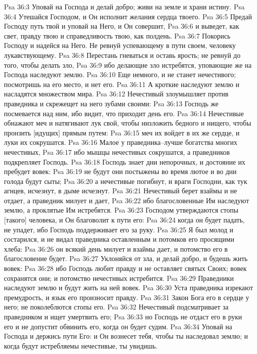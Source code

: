 Psa 36:3  Уповай на Господа и делай добро; живи на земле и храни истину.
Psa 36:4  Утешайся Господом, и Он исполнит желания сердца твоего.
Psa 36:5  Предай Господу путь твой и уповай на Него, и Он совершит,
Psa 36:6  и выведет, как свет, правду твою и справедливость твою, как полдень.
Psa 36:7  Покорись Господу и надейся на Него. Не ревнуй успевающему в пути своем, человеку лукавствующему.
Psa 36:8  Перестань гневаться и оставь ярость; не ревнуй до того, чтобы делать зло,
Psa 36:9  ибо делающие зло истребятся, уповающие же на Господа наследуют землю.
Psa 36:10  Еще немного, и не станет нечестивого; посмотришь на его место, и нет его.
Psa 36:11  А кроткие наследуют землю и насладятся множеством мира.
Psa 36:12  Нечестивый злоумышляет против праведника и скрежещет на него зубами своими:
Psa 36:13  Господь же посмевается над ним, ибо видит, что приходит день его.
Psa 36:14  Нечестивые обнажают меч и натягивают лук свой, чтобы низложить бедного и нищего, чтобы пронзить [идущих] прямым путем:
Psa 36:15  меч их войдет в их же сердце, и луки их сокрушатся.
Psa 36:16  Малое у праведника--лучше богатства многих нечестивых,
Psa 36:17  ибо мышцы нечестивых сокрушатся, а праведников подкрепляет Господь.
Psa 36:18  Господь знает дни непорочных, и достояние их пребудет вовек:
Psa 36:19  не будут они постыжены во время лютое и во дни голода будут сыты;
Psa 36:20  а нечестивые погибнут, и враги Господни, как тук агнцев, исчезнут, в дыме исчезнут.
Psa 36:21  Нечестивый берет взаймы и не отдает, а праведник милует и дает,
Psa 36:22  ибо благословенные Им наследуют землю, а проклятые Им истребятся.
Psa 36:23  Господом утверждаются стопы [такого] человека, и Он благоволит к пути его:
Psa 36:24  когда он будет падать, не упадет, ибо Господь поддерживает его за руку.
Psa 36:25  Я был молод и состарился, и не видал праведника оставленным и потомков его просящими хлеба:
Psa 36:26  он всякий день милует и взаймы дает, и потомство его в благословение будет.
Psa 36:27  Уклоняйся от зла, и делай добро, и будешь жить вовек:
Psa 36:28  ибо Господь любит правду и не оставляет святых Своих; вовек сохранятся они; и потомство нечестивых истребится.
Psa 36:29  Праведники наследуют землю и будут жить на ней вовек.
Psa 36:30  Уста праведника изрекают премудрость, и язык его произносит правду.
Psa 36:31  Закон Бога его в сердце у него; не поколеблются стопы его.
Psa 36:32  Нечестивый подсматривает за праведником и ищет умертвить его;
Psa 36:33  но Господь не отдаст его в руки его и не допустит обвинить его, когда он будет судим.
Psa 36:34  Уповай на Господа и держись пути Его: и Он вознесет тебя, чтобы ты наследовал землю; и когда будут истребляемы нечестивые, ты увидишь.
